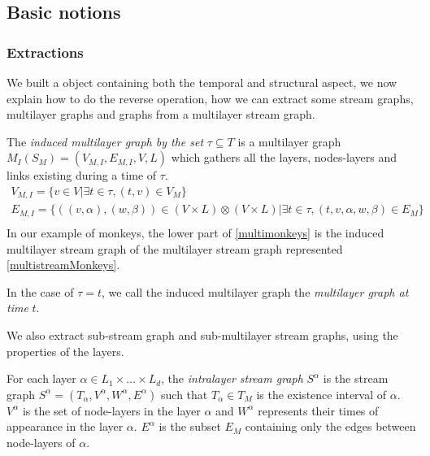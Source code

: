 \documentclass{svproc}
\begin{document}
%
\subsection{Basic notions}
%
\subsubsection{Extractions}

We built a object containing both the temporal and structural aspect, we now explain how to do the reverse operation, how we can extract some stream graphs, multilayer graphs and graphs from a multilayer stream graph.

\begin{definition}
    The {\em induced multilayer graph by the set } $\tau \subseteq T$ is a multilayer graph $M_I(S_M)=(V_{M,I}, E_{M,I}, V,L)$ which gathers all the layers, nodes-layers and links existing during a time of $\tau$.
    \begin{align*}
    	V_{M,I} = \{ v \in V | \exists t \in \tau, (t,v) \in V_M\}\\
    	E_{M,I} = \{((v,\alpha),(w,\beta)) \in (V\times L)\otimes (V\times L) | \exists t \in \tau , (t,v,\alpha,w,\beta) \in E_M \} \\
    \end{align*}
    In our example of monkeys, the lower part of \cref{multimonkeys} is the induced multilayer stream graph of the multilayer stream graph represented \cref{multistreamMonkeys}.
\end{definition}

In the case of $\tau={t}$, we call the induced multilayer graph the {\em multilayer graph at time} $t$.

We also extract sub-stream graph and sub-multilayer stream graphs, using the properties of the layers.

\begin{definition}	
	For each layer $\alpha \in L_1 \times \dots \times L_d$, the {\em intralayer stream graph} $S^{\alpha}$ is the stream graph $S^{\alpha}=(T_{\alpha},V^{\alpha},W^{\alpha},E^{\alpha})$ such that $ T_{\alpha} \in T_M$ is the existence interval of $\alpha$. $V^{\alpha}$ is the set of node-layers in the layer $\alpha$ and $W^{\alpha}$ represents their times of appearance in the layer $\alpha$. $E^{\alpha}$ is the subset $E_M$ containing only the edges between node-layers of $\alpha$.
	\end{definition}
	
\end{document}
